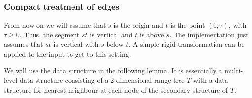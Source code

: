 \documentclass[a4paper,USenglish]{lipics}
\let\ge\geqslant
\begin{document}
\subsubsection{Compact treatment of edges}
\label{sec:quadratic}

From now on we will assume that $s$ is the origin and 
$t$ is the point $(0,\tau)$, with $\tau\ge 0$. Thus, the segment $st$
is vertical and $t$ is above $s$. The implementation just
assumes that $st$ is vertical with $s$ below $t$. 
A simple rigid transformation can be applied to
the input to get to this setting.

We will use the data structure in the following lemma.
It is essentially a multi-level data structure consisting
of a 2-dimensional range tree $T$ with
a data structure for nearest neighbour at each node of the secondary structure
of $T$.
\end{document}
